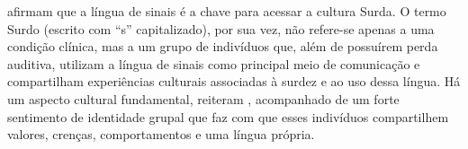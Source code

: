 



 afirmam que a língua de sinais é a chave para acessar a cultura Surda.
O termo Surdo (escrito com ``s'' capitalizado), por sua vez, não refere-se apenas a uma condição clínica, mas a um grupo de indivíduos que, além de possuírem perda auditiva, utilizam a língua de sinais como principal meio de comunicação e compartilham experiências culturais associadas à surdez e ao uso dessa língua.
Há um aspecto cultural fundamental, reiteram , acompanhado de um forte sentimento de identidade grupal que faz com que esses indivíduos compartilhem valores, crenças, comportamentos e uma língua própria.

